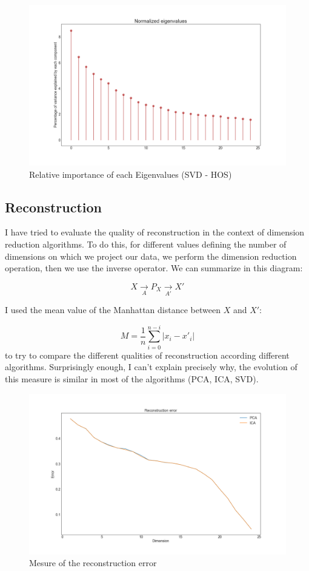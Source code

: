 \documentclass[15pt]{article}
\begin{document}
\begin{multicols}{2}
\begin{figure}[H]
\centering
\includegraphics[width = \columnwidth]{egvHOSsvd.png}
\caption{Relative importance of each Eigenvalues (SVD - HOS)}
\end{figure}

\subsection{Reconstruction}

I have tried to evaluate the quality of reconstruction in the context of dimension reduction algorithms. To do this, for different values defining the number of dimensions on which we project our data, we perform the dimension reduction operation, then we use the inverse operator. We can summarize in this diagram:

$$X \underset{A}{ \rightarrow } P_X \underset{A'}{ \rightarrow } X' $$

I used the mean value of the Manhattan distance between $X$ and $X'$:

$$M = \frac{1}{n}\sum_{i=0}^{n-i} |x_i - x'_i|$$
to try to compare the different qualities of reconstruction according different algorithms. Surprisingly enough, I can't explain precisely why, the evolution of this measure is similar in most of the algorithms (PCA, ICA, SVD).

\begin{figure}[H]
\centering
\includegraphics[width = \columnwidth]{errrecIPCA.png}
\caption{Mesure of the reconstruction error}
\end{figure}


\end{multicols}
\end{document}
